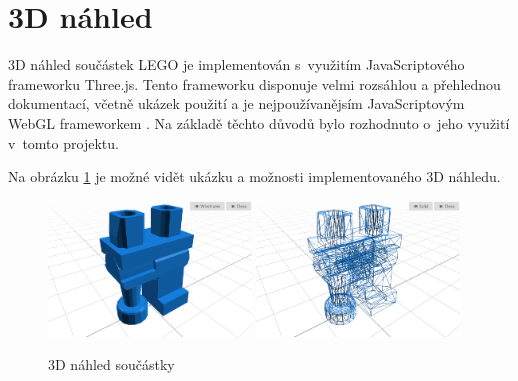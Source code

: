 \section{3D náhled}
3D náhled součástek LEGO je implementován s~využitím JavaScriptového frameworku Three.js. Tento frameworku disponuje velmi rozsáhlou a přehlednou dokumentací, včetně ukázek použití a je nejpoužívanějsím JavaScriptovým WebGL frameworkem \autocite{webgl-comparison}. Na základě těchto důvodů bylo rozhodnuto o~jeho využití v~tomto projektu.





Na obrázku \ref{obrazek-ldraw-shortcut} je možné vidět ukázku a možnosti implementovaného 3D náhledu.

\begin{figure}[htbp]
        \centering
        \includegraphics[width=0.48\textwidth,height=\textheight,keepaspectratio]{images/model-viewer-solid.png}
        \includegraphics[width=0.48\textwidth,height=\textheight,keepaspectratio]{images/model-viewer-wireframe.png}
        \caption{3D náhled součástky \label{obrazek-ldraw-shortcut}}
\end{figure}